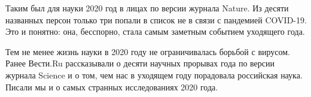 Таким был для науки 2020 год в лицах по версии журнала Nature. Из десяти
названных персон только три попали в список не в связи с пандемией COVID-19.
Это и понятно: она, бесспорно, стала самым заметным событием уходящего года.

Тем не менее жизнь науки в 2020 году не ограничивалась борьбой с вирусом. Ранее
Вести.Ru рассказывали о десяти научных прорывах года по версии журнала Science 
и о том, чем нас в уходящем году порадовала российская наука. Писали мы и о
самых странных исследованиях 2020 года.


